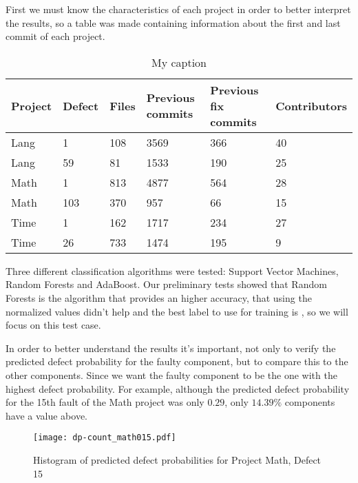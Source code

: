First we must know the characteristics of each project in order to better interpret the results, so a table was made containing information about the first and last commit of each
project.
%
\begin{table}[H]
\centering
\begin{tabular}{|l|l|l|l|l|l|}
\hline
\textbf{Project} & \textbf{Defect} & \textbf{Files} & \textbf{Previous commits} & \textbf{Previous fix commits} & \textbf{Contributors} \\ \hline
Lang             & 1               & 108            & 3569                      & 366                           & 40                    \\ \hline
Lang             & 59              & 81             & 1533                      & 190                           & 25                    \\ \hline
Math             & 1               & 813            & 4877                      & 564                           & 28                    \\ \hline
Math             & 103             & 370            & 957                       & 66                            & 15                    \\ \hline
Time             & 1               & 162            & 1717                      & 234                           & 27                    \\ \hline
Time             & 26              & 733            & 1474                      & 195                           & 9                     \\ \hline
\end{tabular}
\caption{My caption}
\label{my-label}
\end{table}

Three different classification algorithms were tested: Support Vector Machines, Random Forests and AdaBoost.
Our preliminary tests showed that Random Forests is the algorithm that provides an higher accuracy, that using the normalized values didn't help and the best label to use for training is , so we will focus on this test case.

In order to better understand the results it's important, not only to verify the predicted defect probability for the faulty component, but to compare this to the other components.
Since we want the faulty component to be the one with the highest defect probability. For example, although the predicted defect probability for the 15th fault of the Math project was only $0.29$, only $14.39\%$ components have a value above.
%
\begin{figure}[H]
  \begin{center}
    \leavevmode
    \texttt{[image: dp-count\_math015.pdf]}
    \caption{Histogram of predicted defect probabilities for Project Math, Defect 15}
    \label{fig:dp-count_math015}
  \end{center}
\end{figure}

